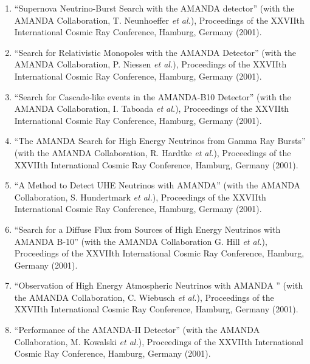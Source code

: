 \begin{enumerate}
\item ``Supernova Neutrino-Burst Search with the AMANDA
        detector'' (with   the AMANDA Collaboration, T.
        Neunhoeffer {\it et al.}), Proceedings of the
        XXVIIth International Cosmic Ray Conference,
        Hamburg, Germany   (2001).

\item ``Search for Relativistic Monopoles with the AMANDA
        Detector'' (with   the AMANDA Collaboration, P.
        Niessen {\it et al.}), Proceedings of the   XXVIIth
        International Cosmic Ray Conference, Hamburg,
        Germany   (2001).

\item ``Search for Cascade-like events in the AMANDA-B10
        Detector'' (with   the AMANDA Collaboration, I.
        Taboada {\it et al.}), Proceedings of the   XXVIIth
        International Cosmic Ray Conference, Hamburg,
        Germany   (2001).

\item ``The AMANDA Search for High Energy Neutrinos from
        Gamma Ray   Bursts'' (with the AMANDA Collaboration,
        R. Hardtke {\it et al.}),   Proceedings of the
        XXVIIth International Cosmic Ray Conference,
        Hamburg, Germany (2001).

\item ``A Method to Detect UHE Neutrinos with AMANDA'' (with
        the AMANDA   Collaboration, S. Hundertmark {\it et
        al.}), Proceedings of the XXVIIth   International
        Cosmic Ray Conference, Hamburg, Germany (2001).

\item ``Search for a Diffuse Flux from Sources of High
        Energy Neutrinos   with AMANDA B-10'' (with the
        AMANDA Collaboration G. Hill {\it et al.}),
        Proceedings of the XXVIIth International Cosmic Ray
        Conference,   Hamburg, Germany (2001).

\item ``Observation of High Energy Atmospheric Neutrinos
        with AMANDA  '' (with the AMANDA Collaboration, C.
        Wiebusch {\it et al.}), Proceedings of   the XXVIIth
        International Cosmic Ray Conference, Hamburg,
        Germany   (2001).

\item ``Performance of the AMANDA-II Detector'' (with the
        AMANDA   Collaboration, M. Kowalski {\it et al.}),
        Proceedings of the XXVIIth   International Cosmic
        Ray Conference, Hamburg, Germany (2001).


\end{enumerate}
